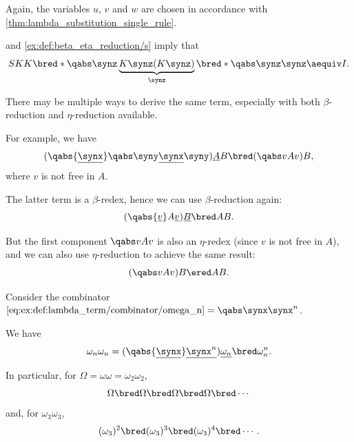 \begin{example}
\begin{thmenum}
    Again, the variables \( u \), \( v \) and \( w \) are chosen in accordance with \cref{thm:lambda_substitution_single_rule}.

      and \cref{ex:def:beta_eta_reduction/s} imply that
    \begin{equation*}
      SKK \bred* \qabs \synz \underbrace{K \synz (K \synz)}_\synz \bred* \qabs \synz \synz \aequiv I.
    \end{equation*}

     There may be multiple ways to derive the same term, especially with both \( \beta \)-reduction and \( \eta \)-reduction available.

    For example, we have
    \begin{equation*}
      (\qabs {\underline{\synx}} \qabs \syny \underline{\synx} \syny) \underline{A} B \bred (\qabs v A v) B,
    \end{equation*}
    where \( v \) is not free in \( A \).

    The latter term is a \( \beta \)-redex, hence we can use \( \beta \)-reduction again:
    \begin{equation*}
      (\qabs {\underline{v}} A \underline{v}) \underline{B} \bred AB.
    \end{equation*}

    But the first component \( \qabs v A v \) is also an \( \eta \)-redex (since \( v \) is not free in \( A \)), and we can also use \( \eta \)-reduction to achieve the same result:
    \begin{equation*}
      (\qabs v A v) B \ered AB.
    \end{equation*}

     Consider the combinator \( \ref{eq:ex:def:lambda_term/combinator/omega_n} = \qabs \synx \synx^n \).

    We have
    \begin{equation*}
      \omega_n \omega_n
      =
      (\qabs {\underline{\synx}} \underline{\synx^n}) \underline{\omega_n}
      \bred
      \omega_n^n.
    \end{equation*}

    In particular, for \( \Omega = \omega \omega = \omega_2 \omega_2 \),
    \begin{equation*}
      \Omega \bred \Omega \bred \Omega \bred \Omega \bred \cdots
    \end{equation*}
    and, for \( \omega_3 \omega_3 \),
    \begin{equation*}
      (\omega_3)^2 \bred (\omega_3)^3 \bred (\omega_3)^4 \bred \cdots.
    \end{equation*}


\end{thmenum}
\end{example}
